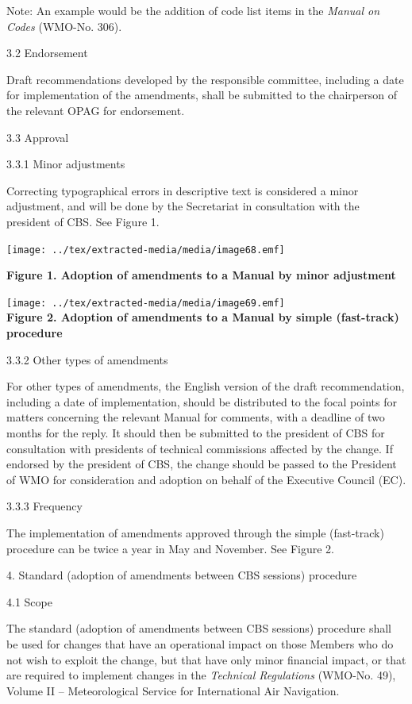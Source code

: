 Note: An example would be the addition of code list items in the \emph{Manual on Codes} (WMO-No. 306).

3.2 Endorsement

Draft recommendations developed by the responsible committee, including a date for implementation of the amendments, shall be submitted to the chairperson of the relevant OPAG for endorsement.

3.3 Approval

3.3.1 Minor adjustments

Correcting typographical errors in descriptive text is considered a minor adjustment, and will be done by the Secretariat in consultation with the president of CBS. See Figure 1.

\texttt{[image: ../tex/extracted-media/media/image68.emf]}

\textbf{Figure 1. Adoption of amendments to a Manual by minor adjustment}

\texttt{[image: ../tex/extracted-media/media/image69.emf]} \textbf{\\
Figure 2. Adoption of amendments to a Manual by simple (fast-track) procedure}

3.3.2 Other types of amendments

For other types of amendments, the English version of the draft recommendation, including a date of implementation, should be distributed to the focal points for matters concerning the relevant Manual for comments, with a deadline of two months for the reply. It should then be submitted to the president of CBS for consultation with presidents of technical commissions affected by the change. If endorsed by the president of CBS, the change should be passed to the President of WMO for consideration and adoption on behalf of the Executive Council (EC).

3.3.3 Frequency

The implementation of amendments approved through the simple (fast-track) procedure can be twice a year in May and November. See Figure 2.

4. Standard (adoption of amendments between CBS sessions) procedure

4.1 Scope

The standard (adoption of amendments between CBS sessions) procedure shall be used for changes that have an operational impact on those Members who do not wish to exploit the change, but that have only minor financial impact, or that are required to implement changes in the \emph{Technical Regulations} (WMO-No. 49), Volume II -- Meteorological Service for International Air Navigation.

